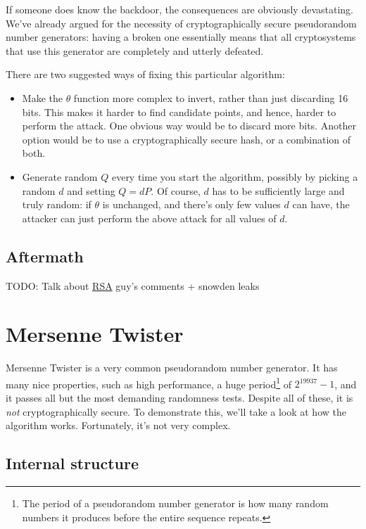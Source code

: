\documentclass[11pt,ebook,table,dvipsnames]{memoir}
\begin{document}
If someone does know the backdoor, the consequences are obviously
devastating. We've already argued for the necessity of
cryptographically secure pseudorandom number generators: having a
broken one essentially means that all cryptosystems that use this
generator are completely and utterly defeated.

There are two suggested ways of fixing this particular algorithm:

\begin{itemize}
\item Make the $\theta$ function more complex to invert, rather than just
discarding 16 bits. This makes it harder to find candidate points,
and hence, harder to perform the attack. One obvious way would be to
discard more bits. Another option would be to use a
cryptographically secure hash, or a combination of both.
\item Generate random $Q$ every time you start the algorithm, possibly by
picking a random $d$ and setting $Q = dP$. Of course, $d$ has to be
sufficiently large and truly random: if $\theta$ is unchanged, and
there's only few values $d$ can have, the attacker can just perform
the above attack for all values of $d$.
\end{itemize}
\subsection{Aftermath}
\label{sec-2-10-5-4}

TODO: Talk about \hyperref[RSA]{RSA} guy's comments + snowden leaks
\section{Mersenne Twister}
\label{sec-2-10-6}

Mersenne Twister is a very common pseudorandom number generator. It
has many nice properties, such as high performance, a huge
period\footnote{The period of a pseudorandom number generator is how many
random numbers it produces before the entire sequence repeats.} of
$2^{19937} - 1$, and it passes all but the most demanding randomness
tests. Despite all of these, it is \emph{not} cryptographically secure. To
demonstrate this, we'll take a look at how the algorithm works.
Fortunately, it's not very complex.

\subsection{Internal structure}
\label{sec-2-10-6-1}
\end{document}
